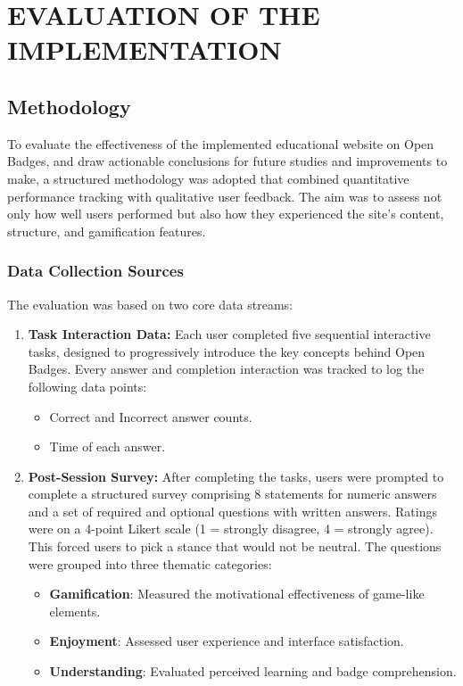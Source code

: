 \section{EVALUATION OF THE IMPLEMENTATION}

\subsection{Methodology}

To evaluate the effectiveness of the implemented educational website on Open Badges, and draw actionable conclusions for future studies and improvements to make, a structured methodology was adopted that combined quantitative performance tracking with qualitative user feedback. 
The aim was to assess not only how well users performed but also how they experienced the site’s content, structure, and gamification features. 

\subsubsection{Data Collection Sources}
The evaluation was based on two core data streams:
\begin{enumerate}
    \item \textbf{Task Interaction Data:} Each user completed five sequential interactive tasks, designed to progressively introduce the key concepts behind Open Badges. 
    Every answer and completion interaction was tracked to log the following data points:
    \begin{itemize}
        \item Correct and Incorrect answer counts.
        \item Time of each answer.
    \end{itemize}
    \item \textbf{Post-Session Survey:} After completing the tasks, users were prompted to complete a structured survey comprising 8 statements for numeric answers and a set of required and optional questions with written answers. 
    Ratings were on a 4-point Likert scale (1 = strongly disagree, 4 = strongly agree). 
    This forced users to pick a stance that would not be neutral. 
    The questions were grouped into three thematic categories:
    \begin{itemize}
        \item \textbf{Gamification}: Measured the motivational effectiveness of game-like elements.
        \item \textbf{Enjoyment}: Assessed user experience and interface satisfaction.
        \item \textbf{Understanding}: Evaluated perceived learning and badge comprehension.
    \end{itemize}
\end{enumerate}

